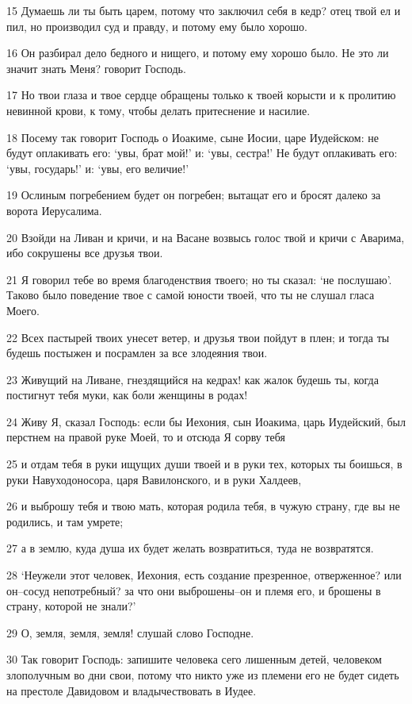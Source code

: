 \par 15 Думаешь ли ты быть царем, потому что заключил себя в кедр? отец твой ел и пил, но производил суд и правду, и потому ему было хорошо.
\par 16 Он разбирал дело бедного и нищего, и потому ему хорошо было. Не это ли значит знать Меня? говорит Господь.
\par 17 Но твои глаза и твое сердце обращены только к твоей корысти и к пролитию невинной крови, к тому, чтобы делать притеснение и насилие.
\par 18 Посему так говорит Господь о Иоакиме, сыне Иосии, царе Иудейском: не будут оплакивать его: `увы, брат мой!' и: `увы, сестра!' Не будут оплакивать его: `увы, государь!' и: `увы, его величие!'
\par 19 Ослиным погребением будет он погребен; вытащат его и бросят далеко за ворота Иерусалима.
\par 20 Взойди на Ливан и кричи, и на Васане возвысь голос твой и кричи с Аварима, ибо сокрушены все друзья твои.
\par 21 Я говорил тебе во время благоденствия твоего; но ты сказал: `не послушаю'. Таково было поведение твое с самой юности твоей, что ты не слушал гласа Моего.
\par 22 Всех пастырей твоих унесет ветер, и друзья твои пойдут в плен; и тогда ты будешь постыжен и посрамлен за все злодеяния твои.
\par 23 Живущий на Ливане, гнездящийся на кедрах! как жалок будешь ты, когда постигнут тебя муки, как боли женщины в родах!
\par 24 Живу Я, сказал Господь: если бы Иехония, сын Иоакима, царь Иудейский, был перстнем на правой руке Моей, то и отсюда Я сорву тебя
\par 25 и отдам тебя в руки ищущих души твоей и в руки тех, которых ты боишься, в руки Навуходоносора, царя Вавилонского, и в руки Халдеев,
\par 26 и выброшу тебя и твою мать, которая родила тебя, в чужую страну, где вы не родились, и там умрете;
\par 27 а в землю, куда душа их будет желать возвратиться, туда не возвратятся.
\par 28 `Неужели этот человек, Иехония, есть создание презренное, отверженное? или он--сосуд непотребный? за что они выброшены--он и племя его, и брошены в страну, которой не знали?'
\par 29 О, земля, земля, земля! слушай слово Господне.
\par 30 Так говорит Господь: запишите человека сего лишенным детей, человеком злополучным во дни свои, потому что никто уже из племени его не будет сидеть на престоле Давидовом и владычествовать в Иудее.

